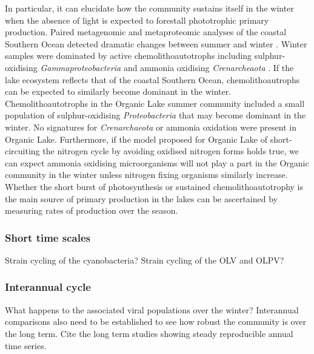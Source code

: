 In particular, it can elucidate how the community sustains itself in the winter when the absence of light is expected to forestall phototrophic primary production.
Paired metagenomic and metaproteomic analyses of the coastal Southern Ocean detected dramatic changes between summer and winter \cite{Grzymski2012, Williams2012a}.
Winter samples were dominated by active chemolithoautotrophs including sulphur-oxidising \emph{Gammaproteobacteria} and ammonia oxidising \emph{Crenarcheaota} \cite{Grzymski2012, Williams2012b}.
If the lake ecosystem reflects that of the coastal Southern Ocean, chemolithoautrophs can be expected to similarly become dominant in the winter. 
Chemolithoautotrophs in the Organic Lake summer community included a small population of sulphur-oxidising \emph{Proteobacteria} that may become dominant in the winter.
No signatures for \emph{Crenarchaeota} or ammonia oxidation were present in Organic Lake.
Furthermore, if the model proposed for Organic Lake of short-circuiting the nitrogen cycle by avoiding oxidised nitrogen forms holds true, we can expect ammonia oxidising microorganisms will not play a part in the Organic community in the winter unless nitrogen fixing organisms similarly increase.
Whether the short burst of photosynthesis or sustained chemolithoautotrophy is the main source of primary production in the lakes can be ascertained by measuring rates of production over the season.

\subsubsection{Short time scales}
Strain cycling of the cyanobacteria?
Strain cycling of the OLV and OLPV?

\subsubsection{Interannual cycle}
What happens to the associated viral populations over the winter?
Interannual comparisons also need to be established to see how robust the community is over the long term.
Cite the long term studies showing steady reproducible annual time series.






